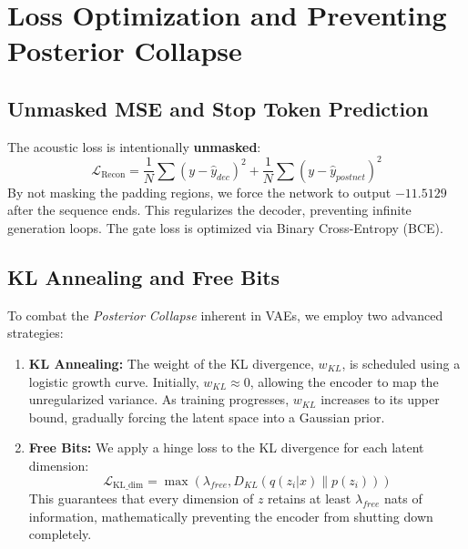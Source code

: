 \documentclass[12pt]{article}
\begin{document}
\section{Loss Optimization and Preventing Posterior Collapse}

\subsection{Unmasked MSE and Stop Token Prediction}
The acoustic loss is intentionally \textbf{unmasked}:
\begin{equation}
\mathcal{L}_{\text{Recon}} = \frac{1}{N} \sum (y - \hat{y}_{dec})^2 + \frac{1}{N} \sum (y - \hat{y}_{postnet})^2
\end{equation}
By not masking the padding regions, we force the network to output $-11.5129$ after the sequence ends. This regularizes the decoder, preventing infinite generation loops. The gate loss is optimized via Binary Cross-Entropy (BCE).

\subsection{KL Annealing and Free Bits}
To combat the \textit{Posterior Collapse} inherent in VAEs, we employ two advanced strategies:
\begin{enumerate}
    \item \textbf{KL Annealing:} The weight of the KL divergence, $w_{KL}$, is scheduled using a logistic growth curve. Initially, $w_{KL} \approx 0$, allowing the encoder to map the unregularized variance. As training progresses, $w_{KL}$ increases to its upper bound, gradually forcing the latent space into a Gaussian prior.
    \item \textbf{Free Bits:} We apply a hinge loss to the KL divergence for each latent dimension:
    \begin{equation}
    \mathcal{L}_{\text{KL\_dim}} = \max\left( \lambda_{free}, D_{KL}(q(z_i|x) \| p(z_i)) \right)
    \end{equation}
    This guarantees that every dimension of $z$ retains at least $\lambda_{free}$ nats of information, mathematically preventing the encoder from shutting down completely.
\end{enumerate}
\end{document}

